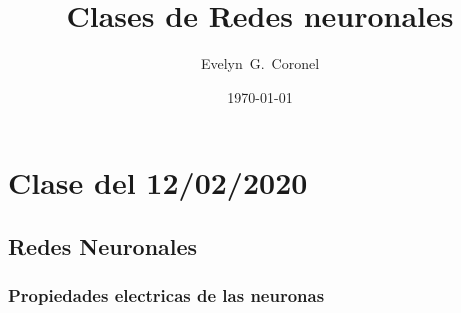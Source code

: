 



\title{Clases  de Redes neuronales}
\author{Evelyn~G.~Coronel}


\date[]{\lowercase{\today}} %

\begin{abstract}

\end{abstract} 
\maketitle
%


\section{Clase del 12/02/2020}


\subsection{Redes Neuronales}

\subsubsection{Propiedades electricas de las neuronas}

